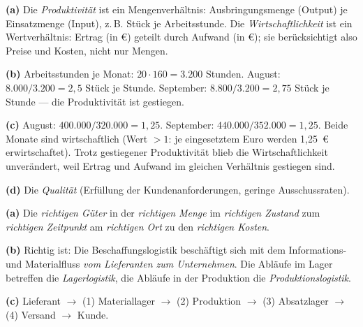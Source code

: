 \documentclass[11pt, a4paper]{article}
\begin{document}
\begin{loesung}[title={Lösung Aufgabe~4 --- Produktivität und Wirtschaftlichkeit}]
\textbf{(a)} Die \emph{Produktivität} ist ein Mengenverhältnis: Ausbringungsmenge
(Output) je Einsatzmenge (Input), z.\,B. Stück je Arbeitsstunde. Die
\emph{Wirtschaftlichkeit} ist ein Wertverhältnis: Ertrag (in €) geteilt durch Aufwand
(in €); sie berücksichtigt also Preise und Kosten, nicht nur Mengen.

\textbf{(b)} Arbeitsstunden je Monat: $20 \cdot 160 = 3.200$ Stunden.
August: $8.000 / 3.200 = 2{,}5$ Stück je Stunde.
September: $8.800 / 3.200 = 2{,}75$ Stück je Stunde --- die Produktivität ist gestiegen.

\textbf{(c)} August: $400.000 / 320.000 = 1{,}25$. September: $440.000 / 352.000 =
1{,}25$. Beide Monate sind wirtschaftlich (Wert $> 1$: je eingesetztem Euro werden
1,25~€ erwirtschaftet). Trotz gestiegener Produktivität blieb die Wirtschaftlichkeit
unverändert, weil Ertrag und Aufwand im gleichen Verhältnis gestiegen sind.

\textbf{(d)} Die \emph{Qualität} (Erfüllung der Kundenanforderungen, geringe
Ausschussraten).
\end{loesung}

\begin{loesung}[title={Lösung Aufgabe~5 --- Logistik: Teilbereiche und 6 R}]
\textbf{(a)} Die \emph{richtigen Güter} in der \emph{richtigen Menge} im
\emph{richtigen Zustand} zum \emph{richtigen Zeitpunkt} am \emph{richtigen Ort} zu den
\emph{richtigen Kosten}.

\textbf{(b)} Richtig ist: Die Beschaffungslogistik beschäftigt sich mit dem
Informations- und Materialfluss \emph{vom Lieferanten zum Unternehmen}. Die Abläufe im
Lager betreffen die \emph{Lagerlogistik}, die Abläufe in der Produktion die
\emph{Produktionslogistik}.

\textbf{(c)} Lieferant $\rightarrow$ (1) Materiallager $\rightarrow$ (2) Produktion
$\rightarrow$ (3) Absatzlager $\rightarrow$ (4) Versand $\rightarrow$ Kunde.
\end{loesung}
\end{document}
